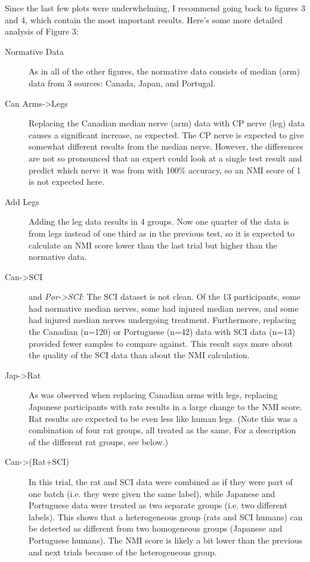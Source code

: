 \documentclass[12pt]{article}
\begin{document}
Since the last few plots were underwhelming, I recommend going back to figures 3 and 4, which contain the most important results. Here's some more detailed analysis of Figure 3:

\begin{description}
\item [Normative Data] As in all of the other figures, the normative data consists of median (arm) data from 3 sources: Canada, Japan, and Portugal.
\item [Can Arms->Legs] Replacing the Canadian median nerve (arm) data with CP nerve (leg) data causes a significant increase, as expected. The CP nerve is expected to give somewhat different results from the median nerve. However, the differences are not so pronounced that an expert could look at a single test result and predict which nerve it was from with 100\% accuracy, so an NMI score of 1 is not expected here.
\item [Add Legs] Adding the leg data results in 4 groups. Now one quarter of the data is from legs instead of one third as in the previous test, so it is expected to calculate an NMI score lower than the last trial but higher than the normative data.
\item [Can->SCI]and \emph{Por->SCI}: The SCI dataset is not clean. Of the 13 participants, some had normative median nerves, some had injured median nerves, and some had injured median nerves undergoing treatment. Furthermore, replacing the Canadian (n=120) or Portuguese (n=42) data with SCI data (n=13) provided fewer samples to compare against. This result says more about the quality of the SCI data than about the NMI calculation.
\item [Jap->Rat] As was observed when replacing Canadian arms with legs, replacing Japanese participants with rats results in a large change to the NMI score. Rat results are expected to be even less like human legs. (Note this was a combination of four rat groups, all treated as the same. For a description of the different rat groups, see below.)
\item [Can->(Rat+SCI)] In this trial, the rat and SCI data were combined as if they were part of one batch (i.e. they were given the same label), while Japanese and Portuguese data were treated as two separate groups (i.e. two different labels). This shows that a heterogeneous group (rats and SCI humans) can be detected as different from two homogeneous groups (Japanese and Portuguese humans). The NMI score is likely a bit lower than the previous and next trials because of the heterogeneous group.

\end{description}
\end{document}
